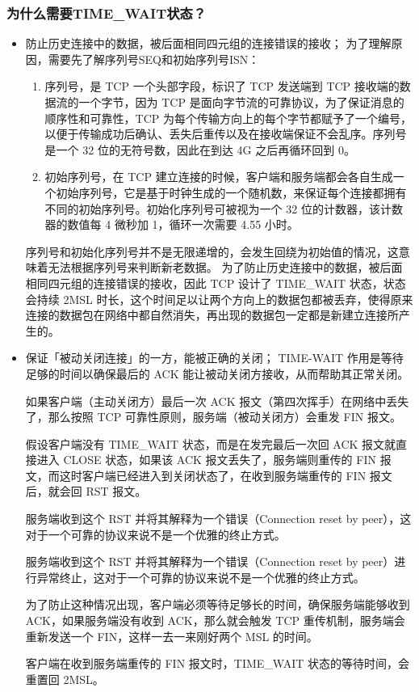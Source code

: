 \documentclass[11pt]{article}
\begin{document}
\subsubsection{为什么需要TIME\_WAIT状态？}
\label{sec:orgd0cc5b1}
\begin{itemize}
\item 防止历史连接中的数据，被后面相同四元组的连接错误的接收；
为了理解原因，需要先了解序列号SEQ和初始序列号ISN：
\begin{enumerate}
\item 序列号，是 TCP 一个头部字段，标识了 TCP 发送端到 TCP 接收端的数据流的一个字节，因为 TCP 是面向字节流的可靠协议，为了保证消息的顺序性和可靠性，TCP 为每个传输方向上的每个字节都赋予了一个编号，以便于传输成功后确认、丢失后重传以及在接收端保证不会乱序。序列号是一个 32 位的无符号数，因此在到达 4G 之后再循环回到 0。
\item 初始序列号，在 TCP 建立连接的时候，客户端和服务端都会各自生成一个初始序列号，它是基于时钟生成的一个随机数，来保证每个连接都拥有不同的初始序列号。初始化序列号可被视为一个 32 位的计数器，该计数器的数值每 4 微秒加 1，循环一次需要 4.55 小时。
\end{enumerate}

序列号和初始化序列号并不是无限递增的，会发生回绕为初始值的情况，这意味着无法根据序列号来判断新老数据。
为了防止历史连接中的数据，被后面相同四元组的连接错误的接收，因此 TCP 设计了 TIME\_WAIT 状态，状态会持续 2MSL 时长，这个时间足以让两个方向上的数据包都被丢弃，使得原来连接的数据包在网络中都自然消失，再出现的数据包一定都是新建立连接所产生的。

\item 保证「被动关闭连接」的一方，能被正确的关闭；
TIME-WAIT 作用是等待足够的时间以确保最后的 ACK 能让被动关闭方接收，从而帮助其正常关闭。

如果客户端（主动关闭方）最后一次 ACK 报文（第四次挥手）在网络中丢失了，那么按照 TCP 可靠性原则，服务端（被动关闭方）会重发 FIN 报文。

假设客户端没有 TIME\_WAIT 状态，而是在发完最后一次回 ACK 报文就直接进入 CLOSE 状态，如果该 ACK 报文丢失了，服务端则重传的 FIN 报文，而这时客户端已经进入到关闭状态了，在收到服务端重传的 FIN 报文后，就会回 RST 报文。

服务端收到这个 RST 并将其解释为一个错误（Connection reset by peer），这对于一个可靠的协议来说不是一个优雅的终止方式。

服务端收到这个 RST 并将其解释为一个错误（Connection reset by peer）进行异常终止，这对于一个可靠的协议来说不是一个优雅的终止方式。

为了防止这种情况出现，客户端必须等待足够长的时间，确保服务端能够收到 ACK，如果服务端没有收到 ACK，那么就会触发 TCP 重传机制，服务端会重新发送一个 FIN，这样一去一来刚好两个 MSL 的时间。

客户端在收到服务端重传的 FIN 报文时，TIME\_WAIT 状态的等待时间，会重置回 2MSL。
\end{itemize}
\end{document}
